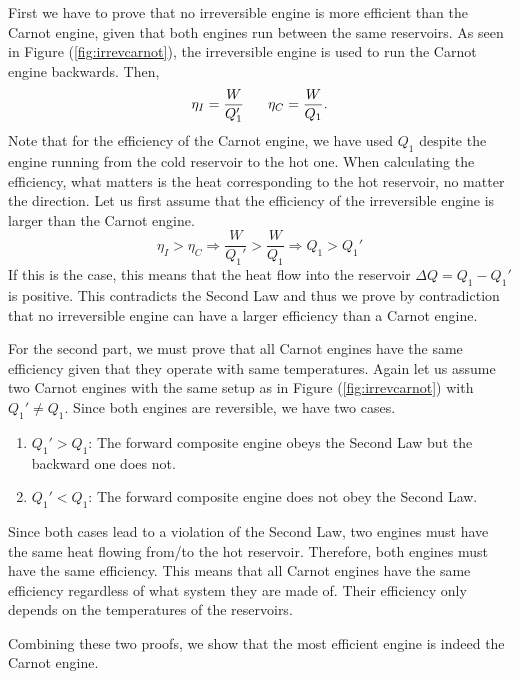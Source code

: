         First we have to prove that no irreversible engine is more efficient than the Carnot engine, given that both engines run between the same reservoirs. As seen in Figure (\ref{fig:irrevcarnot}), the irreversible engine is used to run the Carnot engine backwards. Then,
        \begin{equation}
            \eta_I = \frac{W}{Q_1'} \hspace{0.6cm} \eta_C = \frac{W}{Q_1}.
        \end{equation}
        Note that for the efficiency of the Carnot engine, we have used $Q_1$ despite the engine running from the cold reservoir to the hot one. When calculating the efficiency, what matters is the heat corresponding to the hot reservoir, no matter the direction. Let us first assume that the efficiency of the irreversible engine is larger than the Carnot engine. 
        \begin{equation}
            \eta_I > \eta_C \Rightarrow \frac{W}{Q_1'} > \frac{W}{Q_1} \Rightarrow Q_1 > Q_1'
        \end{equation}
        If this is the case, this means that the heat flow into the reservoir $\Delta Q = Q_1-Q_1'$ is positive. This contradicts the Second Law and thus we prove by contradiction that no irreversible engine can have a larger efficiency than a Carnot engine.
        
        For the second part, we must prove that all Carnot engines have the same efficiency given that they operate with same temperatures. Again let us assume two Carnot engines with the same setup as in Figure (\ref{fig:irrevcarnot}) with $Q_1' \neq Q_1$. Since both engines are reversible, we have two cases.
        \begin{enumerate}
            \item $Q_1'>Q_1$: The forward composite engine obeys the Second Law but the backward one does not. 
            \item $Q_1'<Q_1$: The forward composite engine does not obey the Second Law. 
        \end{enumerate}
        Since both cases lead to a violation of the Second Law, two engines must have the same heat flowing from/to the hot reservoir. Therefore, both engines must have the same efficiency. This means that all Carnot engines have the same efficiency regardless of what system they are made of. Their efficiency only depends on the temperatures of the reservoirs. 
        
        Combining these two proofs, we show that the most efficient engine is indeed the Carnot engine.
        
